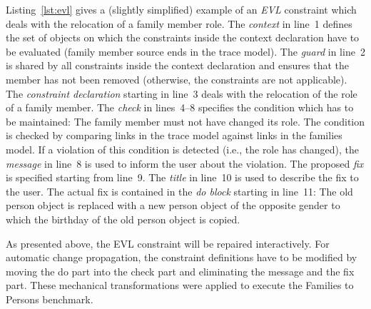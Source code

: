 Listing~\ref{lst:evl} gives a (slightly simplified) example of an \emph{EVL} constraint which deals with the relocation of a family member role. The \emph{context} in line~1 defines the set of objects on which the constraints inside the context declaration have to be evaluated (family member source ends in the trace model). The \emph{guard} in line~2 is shared by all constraints inside the context declaration and ensures that the member has not been removed (otherwise, the constraints are not applicable). The \emph{constraint declaration} starting in line~3 deals with the relocation of the role of a family member. The \emph{check} in lines~4--8 specifies the condition which has to be maintained: The family member must not have changed its role. The condition is checked by comparing links in the trace model against links in the families model. If a violation of this condition is detected (i.e., the role has changed), the \emph{message} in line~8 is used to inform the user about the violation. The proposed \emph{fix} is specified starting from line~9. The \emph{title} in line~10 is used to describe the fix to the user. The actual fix is contained in the \emph{do block} starting in line~11: The old person object is replaced with a new person object of the opposite gender to which the birthday of the old person object is copied.

As presented above, the EVL constraint will be repaired interactively. For automatic change propagation, the constraint definitions have to be modified by moving the do part into the check part and eliminating the message and the fix part. These mechanical transformations were applied to execute the Families to Persons benchmark. 
